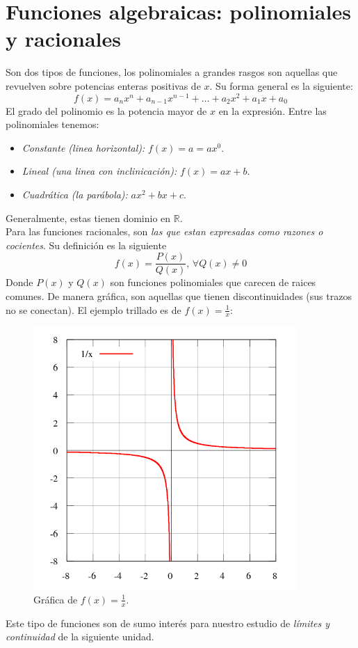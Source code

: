 \documentclass[letterpaper, 12pt]{article}
\begin{document}
        \section{Funciones algebraicas: polinomiales y racionales}
        Son dos tipos de funciones, los polinomiales a grandes rasgos son aquellas que revuelven sobre potencias enteras positivas de \(x\). Su forma general es la siguiente:
        \[f(x)=a_nx^n+a_{n-1}x^{n-1}+\dots+a_2x^2+a_1x+a_0\]
        El grado del polinomio es la potencia mayor de \(x\) en la expresión. Entre las polinomiales tenemos:
        \begin{itemize}
            \item \emph{Constante (linea horizontal):} \(f(x)=a=ax^0\).
            \item \emph{Lineal (una linea con inclinicación):} \(f(x)=ax+b\).
            \item \emph{Cuadrática (la parábola):} \(ax^2+bx+c\). 
        \end{itemize}
        Generalmente, estas tienen dominio en \(\mathbb{R}\).
        \\\newline
        Para las funciones racionales, son \emph{las que estan expresadas como razones o cocientes}. Su definición es la siguiente
        \[f(x)=\frac{P(x)}{Q(x)},\,\forall Q(x)\neq 0\]
        Donde \(P(x)\) y \(Q(x)\) son funciones polinomiales que carecen de raices comunes. De manera gráfica, son aquellas que tienen discontinuidades (sus trazos no se conectan). El ejemplo trillado es de \(f(x)=\frac{1}{x}\):
        \begin{figure}
            \centering
            \includegraphics[width=10cm]{1x.png}
            \caption{Gráfica de \(f(x)=\frac{1}{x}\).}
        \end{figure}
        Este tipo de funciones son de sumo interés para nuestro estudio de \emph{límites y continuidad} de la siguiente unidad.
\end{document}
